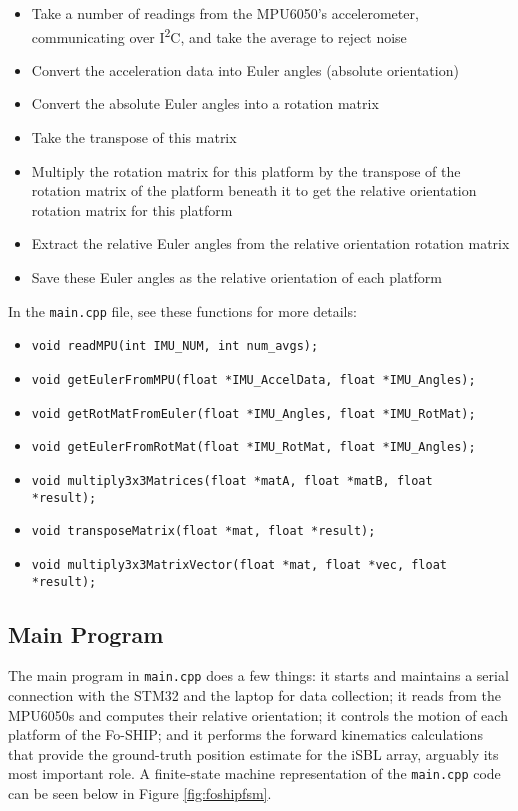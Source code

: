 \documentclass[11pt]{ucthesisCP}
\begin{document}
\begin{itemize}[noitemsep,topsep=0pt]
	\item Take a number of readings from the MPU6050’s accelerometer, communicating over I\textsuperscript{2}C, and take the average to reject noise
	\item Convert the acceleration data into Euler angles (absolute orientation)
	\item Convert the absolute Euler angles into a rotation matrix
	\item Take the transpose of this matrix
	\item Multiply the rotation matrix for this platform by the transpose of the rotation matrix of the platform beneath it to get the relative orientation rotation matrix for this platform
	\item Extract the relative Euler angles from the relative orientation rotation matrix
	\item Save these Euler angles as the relative orientation of each platform
\end{itemize}

\noindent In the \verb|main.cpp| file, see these functions for more details:

\begin{itemize}[noitemsep,topsep=0pt]
	\item \verb|void readMPU(int IMU_NUM, int num_avgs);|
	\item \verb|void getEulerFromMPU(float *IMU_AccelData, float *IMU_Angles);|
	\item \verb|void getRotMatFromEuler(float *IMU_Angles, float *IMU_RotMat);|
	\item \verb|void getEulerFromRotMat(float *IMU_RotMat, float *IMU_Angles);|
	\item \verb|void multiply3x3Matrices(float *matA, float *matB, float|\\ \verb|*result);|
	\item \verb|void transposeMatrix(float *mat, float *result);|
	\item \verb|void multiply3x3MatrixVector(float *mat, float *vec, float|\\ \verb|*result);|
\end{itemize}

\subsection{Main Program} \label{ssec:2s5s3}
The main program in \verb|main.cpp| does a few things: it starts and maintains a serial connection with the STM32 and the laptop for data collection; it reads from the MPU6050s and computes their relative orientation; it controls the motion of each platform of the Fo-SHIP; and it performs the forward kinematics calculations that provide the ground-truth position estimate for the iSBL array, arguably its most important role. A finite-state machine representation of the \verb|main.cpp| code can be seen below in Figure \ref{fig:foshipfsm}.
\end{document}
